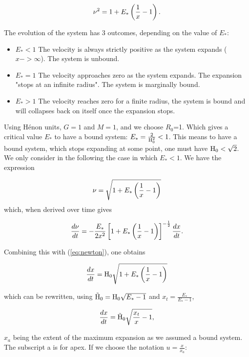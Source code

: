 \begin{equation}
\nu^2  = 1 + E_\ast \left( \frac{1}{x} - 1 \right) .
\end{equation}

The evolution of the system has 3 outcomes, depending on the value of $E_\ast$:
\begin{itemize}
\item $E_\ast<1$ The velocity is always strictly positive as the system expands ($x->\infty$). The system is unbound.
\item $E_\ast=1$ The velocity approaches zero as the system expands. The expansion "stops at an infinite radius". The system is marginally bound.
\item $E_\ast>1$ The velocity reaches zero for a finite radius, the system is bound and will collapses back on itself once the expansion stops. 
\end{itemize}

Using H\'enon units, $G=1$ and $M=1$, and we choose $R_0$=1. Which gives a critical value $E_*$ to have a bound system: $E_* = \frac{2}{{\textrm{H}}^2_0} < 1$. This means to have a bound system, which stops expanding at some point, one must have ${\textrm{H}}_0 < \sqrt{2}$.
We only consider in the following the case in which $E_\ast<1$. We have the expression

\begin{equation}
\nu = \sqrt{1+E_\ast\left(\frac{1}{x} - 1\right)}
\end{equation}
which, when derived over time gives

\begin{equation}
\frac{d \nu}{dt} = - \frac{E_\ast}{2 x^2} \left[ 1 + E_\ast\left(\frac{1}{x} -1\right)\right]^{-\frac{1}{2}} \frac{dx}{dt}.
\end{equation}

Combining this with (\ref{eq:newton}), one obtains

\begin{equation}
\frac{dx}{dt} = {\textrm{H}}_0 \sqrt{1+ E_\ast\left( \frac{1}{x} -1\right)}
\end{equation}

which can be rewritten, using $\tilde{{\textrm{H}}}_0 = {\textrm{H}}_0 \sqrt{E_\ast-1}$ and $x_t=\frac{E_\ast}{E_\ast-1}$,

\begin{equation}
\frac{dx}{dt} = \tilde{{\textrm{H}}}_0 \sqrt{\frac{x_t}{x}-1},
\end{equation}

$x_a$ being the extent of the maximum expansion as we assumed a bound system. The subscript a is for apex. If we choose the notation $u = \frac{x}{x_a}$:

